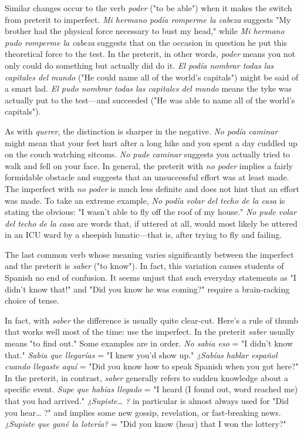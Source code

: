 \documentclass[14pt,a4paper,oneside]{memoir}
\begin{document}
Similar changes occur to the verb \emph{poder} ("to be able") when it
makes the switch from preterit to imperfect. \emph{Mi hermano podía romperme la cabeza} suggests "My brother had the physical force necessary
to bust my head," while \emph{Mi hermano pudo romperme la cabeza} suggests that on the occasion in question he put this theoretical force to
the test. In the preterit, in other words, \emph{poder} means you not only
could do something but actually did do it. \emph{El podía nombrar todas las
capitales del mundo} ("He could name all of the world's capitals")
might be said of a smart lad. \emph{El pudo nombrar todas las capitales del
mundo} means the tyke was actually put to the test---and succeeded
("He was able to name all of the world's capitals").

As with \emph{querer}, the distinction is sharper in the negative. \emph{No
podía caminar} might mean that your feet hurt after a long hike and
you spent a day cuddled up on the couch watching sitcoms. \emph{No pude
caminar} suggests you actually tried to walk and fell on your face. In
general, the preterit with \emph{no poder} implies a fairly formidable obstacle
and suggests that an unsuccessful effort was at least made. The imperfect with \emph{no poder} is much less definite and does not hint that an effort was made. To take an extreme example, \emph{No podía volar del techo
de la casa} is stating the obvious: "I wasn't able to fly off the roof of my
house." \emph{No pude volar del techo de la casa} are words that, if uttered
at all, would most likely be uttered in an ICU ward by a sheepish lunatic---that is, after trying to fly and failing.

The last common verb whose meaning varies significantly
between the imperfect and the preterit is \emph{saber} ("to know"). In fact, this
variation causes students of Spanish no end of confusion. It seems unjust that such everyday statements as "I didn't know that!" and "Did
you know he was coming?" require a brain-racking choice of tense.

In fact, with \emph{saber} the difference is usually quite clear-cut.
Here's a rule of thumb that works well most of the time: use the imperfect. In the preterit \emph{saber} usually means "to find out." Some examples are in order. \emph{No sabia eso} = "I didn't know that." \emph{Sabia que
llegarías} = "I knew you'd show up." \emph{¿Sabías hablar español cuando
llegaste aquí} = "Did you know how to speak Spanish when you got
here?" In the preterit, in contrast, \emph{saber} generally refers to sudden
knowledge about a specific event. \emph{Supe que habías llegado} = "I heard
(I found out, word reached me) that you had arrived." \emph{¿Supiste\ldots{} ?} in
particular is almost always used for "Did you hear\ldots{} ?" and implies
some new gossip, revelation, or fast-breaking news. \emph{¿Supiste que gané
la lotería?} = "Did you know (hear) that I won the lottery?"
\end{document}
